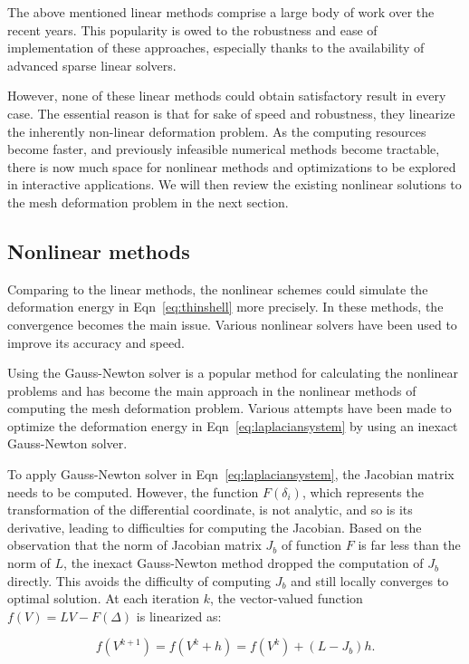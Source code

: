 The above mentioned linear methods comprise a large body of work over the recent years. This popularity is owed to the robustness and ease of implementation of these approaches, especially thanks to the availability of advanced sparse linear solvers.

However, none of these linear methods could obtain satisfactory result in every case. The essential reason is that for sake of speed and robustness, they linearize the inherently non-linear deformation problem. As the computing resources become faster, and previously infeasible numerical methods become tractable, there is now much space for nonlinear methods and optimizations to be explored in interactive applications. We will then review the existing nonlinear solutions to the mesh deformation problem in the next section.

\subsection{Nonlinear methods}\label{ch2:sec:deformation:nonlinear}

Comparing to the linear methods, the nonlinear schemes could simulate the deformation energy in Eqn~\ref{eq:thinshell} more precisely. In these methods, the convergence becomes the main issue. Various nonlinear solvers have been used to improve its accuracy and speed.

Using the Gauss-Newton solver is a popular method for calculating the nonlinear problems and has become the main approach in the nonlinear methods of computing the mesh deformation problem. Various attempts have been made to optimize the deformation energy in Eqn~\ref{eq:laplaciansystem} by using an inexact Gauss-Newton solver.

To apply Gauss-Newton solver in Eqn~\ref{eq:laplaciansystem}, the Jacobian matrix needs to be computed. However, the function $F(\delta_i)$, which represents the transformation of the differential coordinate, is not analytic, and so is its derivative, leading to difficulties for computing the Jacobian. Based on the observation that the norm of Jacobian matrix $J_b$ of function $F$ is far less than the norm of $L$, the inexact Gauss-Newton method dropped the computation of $J_b$ directly. This avoids the difficulty of computing $J_b$ and still locally converges to optimal solution. At each iteration $k$, the vector-valued function $f(V)=LV-F(\Delta)$ is linearized as:

\begin{equation}
\label{eq:InexactGN}
f(V^{k+1})=f(V^k+h)=f(V^k)+(L-J_b)h.
\end{equation}

